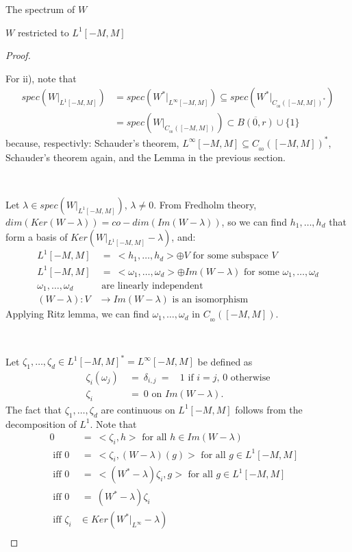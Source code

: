 \documentclass[12pt]{article}
\begin{document}
\begin{section}{The spectrum of $W$ }
\begin{subsection}{$W$ restricted to $L^1[-M,M]$ }
\begin{proof}
	\
	
For ii), note that
\begin{align*}
spec(W\Big|_{L^1[-M,M]}) &= spec(W^* \Big|_{L^{\infty}[-M,M]}) \subseteq spec(W^* \Big|_{C_{_{00}}([-M,M])^*} ) \\
&= spec(W \Big|_{C_{_{00}}([-M,M])} ) \subset \overline{B(0,r)} \cup \{1\}
\end{align*}
because, respectivly: Schauder's theorem, $L^{\infty}[-M,M]  \subseteq C_{_{00}}([-M,M])^*$, Schauder's theorem again, and the Lemma in the previous section.  
\

\

Let $\lambda \in spec(W\Big|_{L^1[-M,M]})$, $\lambda \ne 0$. From Fredholm theory, $dim(Ker(W-\lambda)) = co-dim(Im(W-\lambda))$, so we can find $h_1,\dots,h_d$ that form a basis of $Ker \left( W\Big|_{L^1[-M,M]} - \lambda \right) $, and:
\begin{align*}
L^1[-M,M] &~=~ <h_1,\dots,h_d> \oplus V  \text{ for some subspace $V$ } \\
L^1[-M,M] &~=~ <\omega_1,\dots,\omega_d> \oplus Im(W - \lambda) \text{ for some }\omega_1,\dots,\omega_d\\
\omega_1,\dots,\omega_d &\text{ are linearly independent} \\
(W - \lambda):V &\longrightarrow Im(W - \lambda) \text{   is an isomorphism}
\end{align*}
Applying Ritz lemma, we can find   $\omega_1,\dots,\omega_d$ in  $C_{_{00}}([-M,M])$.
\

\

Let $\zeta_1,\dots,\zeta_d \in L^1[-M,M]^* = L^{\infty}[-M,M]$ be defined as
\begin{align*}
\zeta_i(\omega_j) &~=~ \delta_{i,j} ~=~ \text{ $1$ if $i=j$, $0$ otherwise} \\
\zeta_i &~=~ 0 \text{ on }Im(W - \lambda).
\end{align*}
The fact that $\zeta_1,\dots,\zeta_d$ are continuous on $L^1[-M,M]$ follows from the decomposition of $L^1$. 
Note that 
\begin{align*}
0 &~=~ <\zeta_i, h> \text{ for all } h \in Im(W - \lambda) &\\
\text{ iff } 
0 &~=~ <\zeta_i, (W-\lambda)(g)> \text{ for all } g \in L^1[-M,M] &\\
\text{ iff } 
0 &~=~ <(W^*-\lambda)\zeta_i, g> \text{ for all } g \in L^1[-M,M] &\\
\text{ iff } 0 &~=~ (W^*-\lambda)\zeta_i   &\\
\text{ iff } \zeta_i &\in Ker(W^*\Big|_{L^{\infty}}-\lambda)   &\\
\end{align*}


\end{proof}
\end{subsection}
\end{section}
\end{document}
